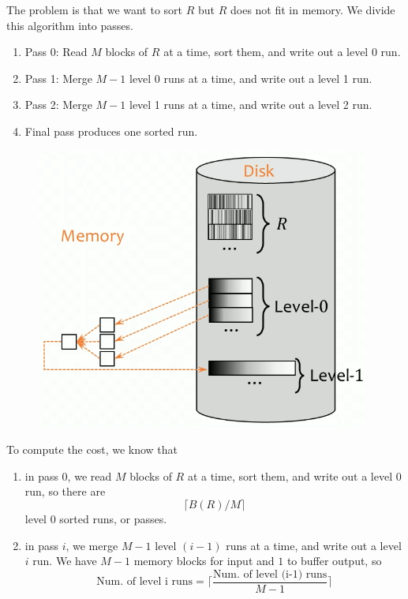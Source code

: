 \documentclass{article}
\begin{document}
    \begin{definition}
      The problem is that we want to sort $R$ but $R$ does not fit in memory. We divide this algorithm into passes. 
      \begin{enumerate}
        \item Pass 0: Read $M$ blocks of $R$ at a time, sort them, and write out a level 0 run. 
        \item Pass 1: Merge $M-1$ level 0 runs at a time, and write out a level 1 run. 
        \item Pass 2: Merge $M-1$ level 1 runs at a time, and write out a level 2 run. 
        \item Final pass produces one sorted run. 
      \end{enumerate}

      \begin{figure}[H]
        \centering 
        \includegraphics[scale=0.4]{img/merge.png}
        \caption{} 
        \label{fig:merge}
      \end{figure}

      To compute the cost, we know that 
      \begin{enumerate}
        \item in pass 0, we read $M$ blocks of $R$ at a time, sort them, and write out a level 0 run, so there are 
          \begin{equation}
            \lceil B(R) / M \rceil
          \end{equation}
          level 0 sorted runs, or passes. 

        \item in pass $i$, we merge $M-1$ level $(i-1)$ runs at a time, and write out a level $i$ run. We have $M-1$ memory blocks for input and $1$ to buffer output, so 
          \begin{equation}
            \text{Num. of level i runs} = \bigg\lceil \frac{\text{Num. of level (i-1) runs}}{M-1} \bigg\rceil 
          \end{equation}


\end{enumerate}
\end{definition}
\end{document}
